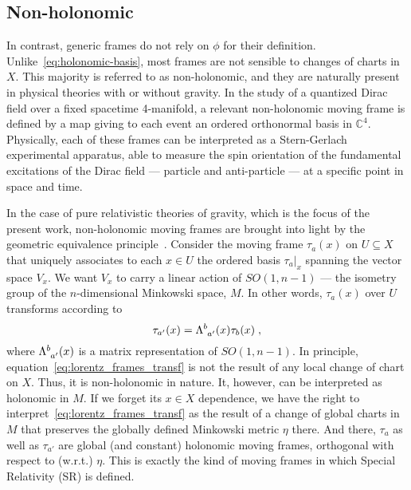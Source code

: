 \documentclass[../../main.tex]{subfiles}
\begin{document}
\subsection{Non-holonomic}\label{ssec:non-holonomic}

In contrast, generic frames do not rely on $\phi$ for their definition. Unlike~\eqref{eq:holonomic-basis}, most frames are not sensible to changes of charts in $X$. This majority is referred to as non-holonomic, and they are naturally present in physical theories with or without gravity. In the study of a quantized Dirac field over a fixed spacetime 4-manifold, a relevant non-holonomic moving frame is defined by a map giving to each event an ordered orthonormal basis in $\mathbb{C}^4$. Physically, each of these frames can be interpreted as a Stern-Gerlach experimental apparatus, able to measure the spin orientation of the fundamental excitations of the Dirac field --- particle and anti-particle --- at a specific point in space and time.

In the case of pure relativistic theories of gravity, which is the focus of the present work, non-holonomic moving frames are brought into light by the geometric equivalence principle~\cite{sardanashvily1983}. Consider the moving frame $\tau_a(x)$ on $ U \subseteq X $ that uniquely associates to each $ x \in U $ the ordered basis $ \tau_a|_x $ spanning the vector space $ V_x $. We want $ V_x $ to carry a linear action of $ SO \left( 1, n-1 \right) $ --- the isometry group of the $n$-dimensional Minkowski space, $ M $. In other words, $ \tau_a(x) $ over $U$ transforms according to
\begin{equation}
  \label{eq:lorentz_frames_transf}
  {\tau}_{a'}(x) = \tensor{\Lambda}{^b_{a'}}(x)\tau_b(x) \;,
\end{equation}
where $\tensor{\Lambda}{^b_{a'}}(x)$ is a matrix representation of $SO(1,n-1)$. In principle, equation~\eqref{eq:lorentz_frames_transf} is not the result of any local change of chart on $X$. Thus, it is non-holonomic in nature. It, however, can be interpreted as holonomic in $M$. If we forget its $x\in X$ dependence, we have the right to interpret~\eqref{eq:lorentz_frames_transf} as the result of a change of global charts in $M$ that preserves the globally defined Minkowski metric $\eta$ there. And there, $\tau_a$ as well as $\tau_{a'}$ are global (and constant) holonomic moving frames, orthogonal with respect to (w.r.t.) $\eta$. This is exactly the kind of moving frames in which Special Relativity (SR) is defined.
\end{document}
